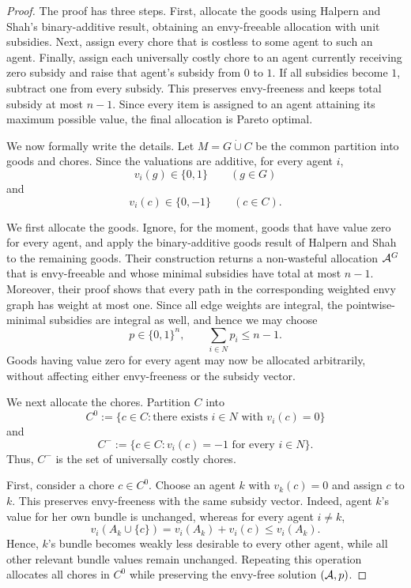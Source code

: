 \begin{proof}
The proof has three steps. First, allocate the goods using Halpern and Shah's
binary-additive result, obtaining an envy-freeable allocation with unit
subsidies. Next, assign every chore that is costless to some agent to such an
agent. Finally, assign each universally costly chore to an agent currently
receiving zero subsidy and raise that agent's subsidy from $0$ to $1$. If all
subsidies become $1$, subtract one from every subsidy. This preserves
envy-freeness and keeps total subsidy at most $n-1$. Since every item is assigned
to an agent attaining its maximum possible value, the final allocation is Pareto
optimal.

We now formally write the details. Let $M=G\mathbin{\dot\cup}C$ be the common
partition into goods and chores. Since the valuations are additive, for every
agent $i$,
\[
  v_i(g)\in\{0,1\}\qquad (g\in G)
\]
and
\[
  v_i(c)\in\{0,-1\}\qquad (c\in C).
\]

We first allocate the goods. Ignore, for the moment, goods that have value zero
for every agent, and apply the binary-additive goods result of Halpern and
Shah~\cite{HS19} to the remaining goods. Their construction returns a
non-wasteful allocation $\mathcal{A}^G$ that is envy-freeable and whose minimal
subsidies have total at most $n-1$. Moreover, their proof shows that every path
in the corresponding weighted envy graph has weight at most one. Since all edge
weights are integral, the pointwise-minimal subsidies are integral as well, and
hence we may choose
\[
  p\in\{0,1\}^n,
  \qquad
  \sum_{i\in N}p_i\leq n-1.
\]
Goods having value zero for every agent may now be allocated arbitrarily,
without affecting either envy-freeness or the subsidy vector.

We next allocate the chores. Partition $C$ into
\[
  C^0:=\{c\in C:\text{there exists }i\in N\text{ with }v_i(c)=0\}
\]
and
\[
  C^-:=\{c\in C:v_i(c)=-1\text{ for every }i\in N\}.
\]
Thus, $C^-$ is the set of universally costly chores.

First, consider a chore $c\in C^0$. Choose an agent $k$ with $v_k(c)=0$ and
assign $c$ to $k$. This preserves envy-freeness with the same subsidy vector.
Indeed, agent $k$'s value for her own bundle is unchanged, whereas for every
agent $i\neq k$,
\[
  v_i(A_k\cup\{c\})
  =
  v_i(A_k)+v_i(c)
  \leq v_i(A_k).
\]
Hence, $k$'s bundle becomes weakly less desirable to every other agent, while all
other relevant bundle values remain unchanged. Repeating this operation allocates
all chores in $C^0$ while preserving the envy-free solution $(\mathcal{A},p)$.


\end{proof}
